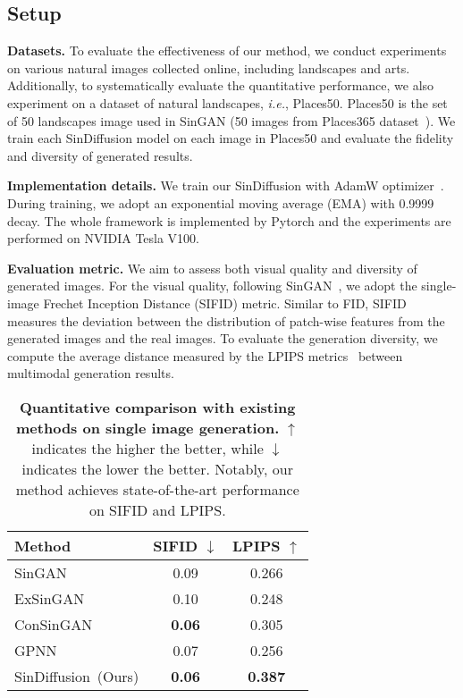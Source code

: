 \documentclass[10pt,twocolumn,letterpaper]{article}
\begin{document}
\subsection{Setup}
\noindent \textbf{Datasets.} 
To evaluate the effectiveness of our method, we conduct experiments on various natural images collected online, including landscapes and arts.
Additionally, to systematically evaluate the quantitative performance, we also experiment on a dataset of natural landscapes, \emph{i.e.}, Places50.
Places50 is the set of 50 landscapes image used in SinGAN (50 images from Places365 dataset~\cite{zhou2018places}).
We train each SinDiffusion model on each image in Places50 and evaluate the fidelity and diversity of generated results.

\noindent \textbf{Implementation details.}
We train our SinDiffusion with AdamW optimizer~\cite{IlyaLoshchilov2018DecoupledWD}.
During training, we adopt an exponential moving average (EMA) with 0.9999 decay.
The whole framework is implemented by Pytorch and the experiments are performed on NVIDIA Tesla V100.

\noindent \textbf{Evaluation metric.}
We aim to assess both visual quality and diversity of generated images.
For the visual quality, following SinGAN~\cite{shaham2019singan}, we adopt the single-image Frechet Inception Distance (SIFID) metric.
Similar to FID, SIFID measures the deviation between the distribution of patch-wise features from the generated images and the real images.
To evaluate the generation diversity, we compute the average distance measured by the LPIPS metrics~\cite{zhang2018unreasonable} between multimodal generation results.


\begin{table}[t]
    \footnotesize
    \centering
    \begin{tabular}{l @{\hskip 17mm} c @{\hskip 17mm} c}
    \toprule
    \textbf{Method} & \textbf{SIFID} $\downarrow$ & \textbf{LPIPS} $\uparrow$ \\
    \midrule
    {SinGAN~\cite{shaham2019singan}} & 0.09 & 0.266 \\
    {ExSinGAN~\cite{zhang2021exsingan}} & 0.10 & 0.248 \\
    {ConSinGAN~\cite{hinz2021improved}} & \textbf{0.06} & 0.305 \\
    {GPNN~\cite{granot2022drop}} & 0.07 & 0.256 \\
    {SinDiffusion~(Ours)} & \textbf{0.06} & \textbf{0.387} \\
    \bottomrule
    \end{tabular}
    \vspace{-3mm}
    \caption{\textbf{Quantitative comparison with existing methods on single image generation.}
    $\uparrow$ indicates the higher the better, while $\downarrow$ indicates the lower the better.
    Notably, our method achieves state-of-the-art performance on SIFID and LPIPS. 
    }
    \vspace{-6mm}
    \label{tab:quantitative}
\end{table}
\end{document}
